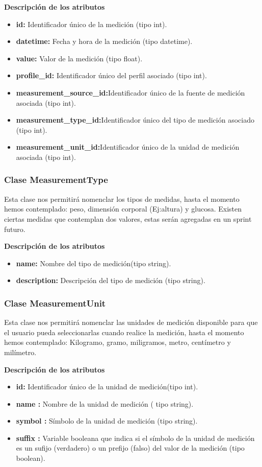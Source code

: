 \textbf{Descripción de los atributos}
\begin{itemize}
	\item \textbf{id:} Identificador único de la medición (tipo int).
	\item \textbf{datetime:} Fecha y hora de la medición (tipo datetime).
	\item \textbf{value:} Valor de la medición (tipo float).
	\item \textbf{profile\_id:} Identificador único del perfil asociado (tipo int).
	\item \textbf{measurement\_source\_id:}Identificador único de la fuente de medición asociada (tipo int).
	\item \textbf{measurement\_type\_id:}Identificador único del tipo de medición asociado (tipo int).
	\item \textbf{measurement\_unit\_id:}Identificador único de la unidad de medición asociada (tipo int).
	
\end{itemize}

\subsubsection{Clase MeasurementType}
Esta clase nos permitirá  nomenclar  los tipos de medidas, hasta el momento hemos contemplado: peso, dimensión corporal (Ej:altura) y glucosa. Existen ciertas medidas que contemplan dos valores, estas serán agregadas en un sprint futuro.

\textbf{Descripción de los atributos}
\begin{itemize}
	\item \textbf{name: }	Nombre del tipo de medición(tipo string).
	\item \textbf{description:} Descripción del tipo de medición (tipo string).
\end{itemize}


\subsubsection{Clase MeasurementUnit}
Esta clase nos permitirá  nomenclar  las unidades de medición disponible para que el usuario pueda seleccionarlas cuando realice la medición, hasta el momento hemos contemplado: Kilogramo, gramo, miligramos, metro, centímetro y milímetro.

\textbf{Descripción de los atributos}
\begin{itemize}
	\item \textbf{id:	}	Identificador único de la unidad de medición(tipo int).
	\item \textbf{name :	}	Nombre de la unidad de medición ( tipo string).
	\item \textbf{symbol :}		Símbolo de la unidad de medición (tipo string).
	\item \textbf{suffix :}	Variable booleana que indica si el símbolo de la unidad de medición es un sufijo (verdadero) o un prefijo (falso) del valor de la medición (tipo boolean).
\end{itemize}



